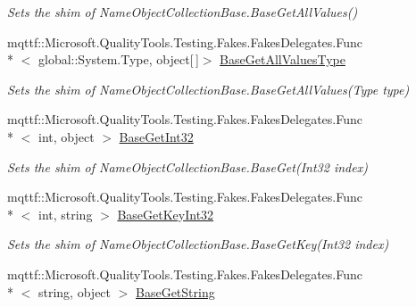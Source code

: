 \begin{DoxyCompactItemize}
\begin{DoxyCompactList}\small\item\em Sets the shim of Name\-Object\-Collection\-Base.\-Base\-Get\-All\-Values()\end{DoxyCompactList}\item 
mqttf\-::\-Microsoft.\-Quality\-Tools.\-Testing.\-Fakes.\-Fakes\-Delegates.\-Func\\*
$<$ global\-::\-System.\-Type, object\mbox{[}$\,$\mbox{]}$>$ \hyperlink{class_system_1_1_collections_1_1_specialized_1_1_fakes_1_1_shim_name_object_collection_base_a23c31c5c64207a89877656394e9b030a}{Base\-Get\-All\-Values\-Type}
\begin{DoxyCompactList}\small\item\em Sets the shim of Name\-Object\-Collection\-Base.\-Base\-Get\-All\-Values(\-Type type)\end{DoxyCompactList}\item 
mqttf\-::\-Microsoft.\-Quality\-Tools.\-Testing.\-Fakes.\-Fakes\-Delegates.\-Func\\*
$<$ int, object $>$ \hyperlink{class_system_1_1_collections_1_1_specialized_1_1_fakes_1_1_shim_name_object_collection_base_affcd125b73d79e081105c93ba4b58bb4}{Base\-Get\-Int32}
\begin{DoxyCompactList}\small\item\em Sets the shim of Name\-Object\-Collection\-Base.\-Base\-Get(\-Int32 index)\end{DoxyCompactList}\item 
mqttf\-::\-Microsoft.\-Quality\-Tools.\-Testing.\-Fakes.\-Fakes\-Delegates.\-Func\\*
$<$ int, string $>$ \hyperlink{class_system_1_1_collections_1_1_specialized_1_1_fakes_1_1_shim_name_object_collection_base_a6420026e75782f1b1a6641b3a78f43c1}{Base\-Get\-Key\-Int32}
\begin{DoxyCompactList}\small\item\em Sets the shim of Name\-Object\-Collection\-Base.\-Base\-Get\-Key(\-Int32 index)\end{DoxyCompactList}\item 
mqttf\-::\-Microsoft.\-Quality\-Tools.\-Testing.\-Fakes.\-Fakes\-Delegates.\-Func\\*
$<$ string, object $>$ \hyperlink{class_system_1_1_collections_1_1_specialized_1_1_fakes_1_1_shim_name_object_collection_base_abdc39d7aaf229a4857442293e3f421d4}{Base\-Get\-String}

\end{DoxyCompactItemize}
